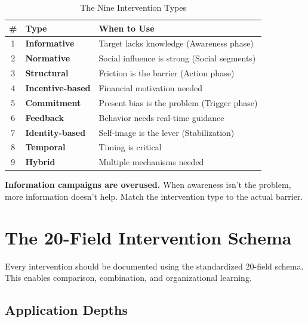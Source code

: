 \documentclass[11pt,a4paper]{article}
\begin{document}
\begin{table}[h]
\centering
\renewcommand{\arraystretch}{1.4}
\begin{tabular}{@{}clp{6cm}@{}}
\toprule
\textbf{\#} & \textbf{Type} & \textbf{When to Use} \\
\midrule
1 & \textbf{Informative} & Target lacks knowledge (Awareness phase) \\
2 & \textbf{Normative} & Social influence is strong (Social segments) \\
3 & \textbf{Structural} & Friction is the barrier (Action phase) \\
4 & \textbf{Incentive-based} & Financial motivation needed \\
5 & \textbf{Commitment} & Present bias is the problem (Trigger phase) \\
6 & \textbf{Feedback} & Behavior needs real-time guidance \\
7 & \textbf{Identity-based} & Self-image is the lever (Stabilization) \\
8 & \textbf{Temporal} & Timing is critical \\
9 & \textbf{Hybrid} & Multiple mechanisms needed \\
\bottomrule
\end{tabular}
\caption{The Nine Intervention Types}
\end{table}

\begin{tcolorbox}[colback=warningorange!10, colframe=warningorange, title=\textbf{Common Mistake}]
\textbf{Information campaigns are overused.} When awareness isn't the problem, more information doesn't help. Match the intervention type to the actual barrier.
\end{tcolorbox}

\section{The 20-Field Intervention Schema}

Every intervention should be documented using the standardized 20-field schema. This enables comparison, combination, and organizational learning.

\subsection{Application Depths}
\end{document}
